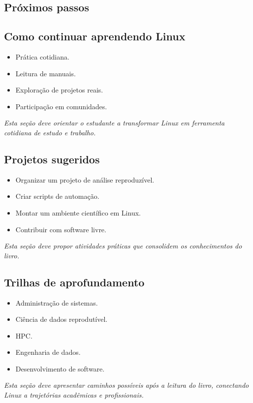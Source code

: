 \documentclass[12pt,openany]{book}
\newcommand{\placeholder}[1]{
    \par\medskip
    \noindent\textit{#1}
    \par\medskip
}
\newcommand{\topicos}[1]{
    \begin{itemize}
        #1
    \end{itemize}
}
\begin{document}
\begin{refsection}
\chapter{Próximos passos}

\section{Como continuar aprendendo Linux}

\topicos{
    \item Prática cotidiana.
    \item Leitura de manuais.
    \item Exploração de projetos reais.
    \item Participação em comunidades.
}

\placeholder{Esta seção deve orientar o estudante a transformar Linux em ferramenta cotidiana de estudo e trabalho.}

\section{Projetos sugeridos}

\topicos{
    \item Organizar um projeto de análise reproduzível.
    \item Criar scripts de automação.
    \item Montar um ambiente científico em Linux.
    \item Contribuir com software livre.
}

\placeholder{Esta seção deve propor atividades práticas que consolidem os conhecimentos do livro.}

\section{Trilhas de aprofundamento}

\topicos{
    \item Administração de sistemas.
    \item Ciência de dados reprodutível.
    \item HPC.
    \item Engenharia de dados.
    \item Desenvolvimento de software.
}

\placeholder{Esta seção deve apresentar caminhos possíveis após a leitura do livro, conectando Linux a trajetórias acadêmicas e profissionais.}


\end{refsection}
\end{document}
